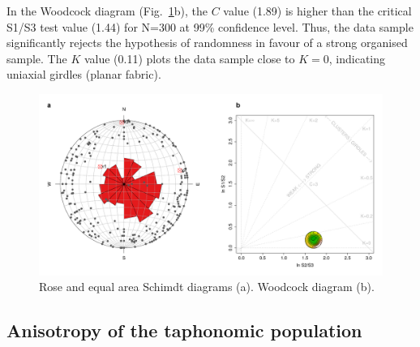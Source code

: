 \documentclass[review,times,authoryear]{elsarticle} %
\begin{document}
In the Woodcock diagram (Fig.~\ref{fig:fabric}b), the $C$ value (1.89) is higher than the critical S1/S3 test value (1.44) for N=300 at 99\% confidence level. Thus, the data sample significantly rejects the hypothesis of randomness in favour of a strong organised sample. The $K$ value (0.11) plots the data sample close to $K=0$, indicating uniaxial girdles (planar fabric).

\begin{figure}
  \centering
  \includegraphics[width=1\textwidth]{./artwork/Fig:fabric_.pdf}
  \caption{Rose and equal area Schimdt diagrams (a). Woodcock diagram (b).}
  \label{fig:fabric}
\end{figure}

\subsection{Anisotropy of the taphonomic population}
\end{document}
